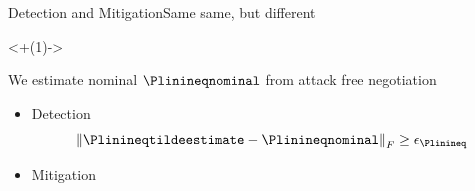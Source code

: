 \documentclass[aspectratio=169]{beamer}
\begin{document}
\begin{frame}{Detection and Mitigation}{Same same, but different}

  \onslide<+(1)->{
    \begin{assumption}
      We estimate nominal $\Plinineqnominal$ from attack free negotiation
    \end{assumption}
  }

  \begin{itemize}[<+(1)->]
    \item Detection
          \begin{equation*}
            \norm{\Plinineqtildeestimate-\Plinineqnominal}_{F} \geq\epsilon_{\Plinineq}
          \end{equation*}
    \item Mitigation
  \end{itemize}
\end{frame}
\end{document}
